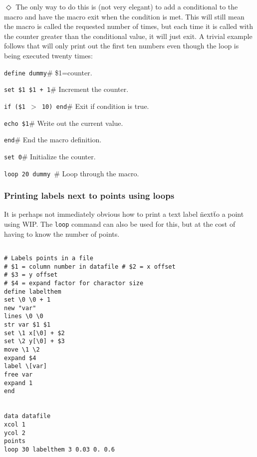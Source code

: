 \indent$\Diamond$
The only way to do this is (not very elegant) to add a
conditional to the macro and have the macro exit when
the condition is met.
This will still mean the macro is called the requested number of times,
but each time it is called with the counter greater than the
conditional value, it will just exit.
A trivial example follows that will only print out the first ten numbers
even though the loop is being executed twenty times:
\begin{wiplist}%
  \item {\tt define dummy}\hfill\# \$1=counter.
  \samepage
  \item [\wipd] {\tt set \$1 \$1 + 1}\hfill\# Increment the counter.
  \item [\wipd] {\tt if (\$1 $>$ 10) end}\hfill\# Exit if condition is true.
  \item [\wipd] {\tt echo \$1}\hfill\# Write out the current value.
  \item [\wipd] {\tt end}\hfill\#  End the macro definition.
  \item {\tt set  0}\hfill\# Initialize the counter.
  \item {\tt loop 20 dummy }\hfill\# Loop through the macro.
\end{wiplist}


\subsubsection*         {Printing labels next to points using loops}

It is perhaps not immediately obvious how to print a text label \"next\"
to a point using WIP. The {\tt loop} command can also be used for this,
but at the cost of having to know the number of points.

\begin{verbatim}

# Labels points in a file
# $1 = column number in datafile # $2 = x offset
# $3 = y offset
# $4 = expand factor for charactor size
define labelthem
set \0 \0 + 1
new "var"
lines \0 \0
str var $1 $1
set \1 x[\0] + $2
set \2 y[\0] + $3
move \1 \2
expand $4
label \[var]
free var
expand 1
end


data datafile
xcol 1
ycol 2
points
loop 30 labelthem 3 0.03 0. 0.6


\end{verbatim}
